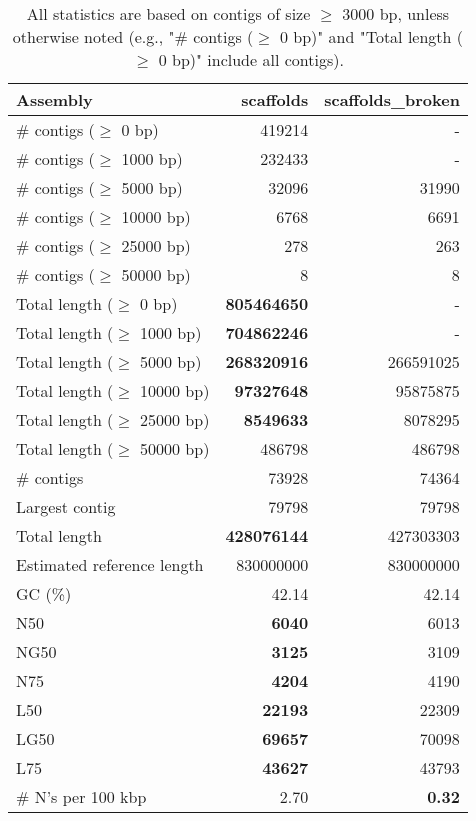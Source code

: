 \documentclass[12pt,a4paper]{article}
\begin{document}
\begin{table}[ht]
\begin{center}
\caption{All statistics are based on contigs of size $\geq$ 3000 bp, unless otherwise noted (e.g., "\# contigs ($\geq$ 0 bp)" and "Total length ($\geq$ 0 bp)" include all contigs).}
\begin{tabular}{|l*{2}{|r}|}
\hline
Assembly & scaffolds & scaffolds\_broken \\ \hline
\# contigs ($\geq$ 0 bp) & 419214 & - \\ \hline
\# contigs ($\geq$ 1000 bp) & 232433 & - \\ \hline
\# contigs ($\geq$ 5000 bp) & 32096 & 31990 \\ \hline
\# contigs ($\geq$ 10000 bp) & 6768 & 6691 \\ \hline
\# contigs ($\geq$ 25000 bp) & 278 & 263 \\ \hline
\# contigs ($\geq$ 50000 bp) & 8 & 8 \\ \hline
Total length ($\geq$ 0 bp) & {\bf 805464650} & - \\ \hline
Total length ($\geq$ 1000 bp) & {\bf 704862246} & - \\ \hline
Total length ($\geq$ 5000 bp) & {\bf 268320916} & 266591025 \\ \hline
Total length ($\geq$ 10000 bp) & {\bf 97327648} & 95875875 \\ \hline
Total length ($\geq$ 25000 bp) & {\bf 8549633} & 8078295 \\ \hline
Total length ($\geq$ 50000 bp) & 486798 & 486798 \\ \hline
\# contigs & 73928 & 74364 \\ \hline
Largest contig & 79798 & 79798 \\ \hline
Total length & {\bf 428076144} & 427303303 \\ \hline
Estimated reference length & 830000000 & 830000000 \\ \hline
GC (\%) & 42.14 & 42.14 \\ \hline
N50 & {\bf 6040} & 6013 \\ \hline
NG50 & {\bf 3125} & 3109 \\ \hline
N75 & {\bf 4204} & 4190 \\ \hline
L50 & {\bf 22193} & 22309 \\ \hline
LG50 & {\bf 69657} & 70098 \\ \hline
L75 & {\bf 43627} & 43793 \\ \hline
\# N's per 100 kbp & 2.70 & {\bf 0.32} \\ \hline
\end{tabular}
\end{center}
\end{table}
\end{document}
